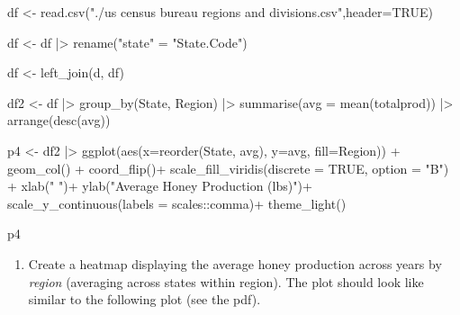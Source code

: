 \documentclass[
]{article}
\newenvironment{Shaded}{\begin{snugshade}}{\end{snugshade}}
\newcommand{\AttributeTok}[1]{\textcolor[rgb]{0.77,0.63,0.00}{#1}}
\newcommand{\ConstantTok}[1]{\textcolor[rgb]{0.00,0.00,0.00}{#1}}
\newcommand{\FunctionTok}[1]{\textcolor[rgb]{0.00,0.00,0.00}{#1}}
\newcommand{\NormalTok}[1]{#1}
\newcommand{\OtherTok}[1]{\textcolor[rgb]{0.56,0.35,0.01}{#1}}
\newcommand{\SpecialCharTok}[1]{\textcolor[rgb]{0.00,0.00,0.00}{#1}}
\newcommand{\StringTok}[1]{\textcolor[rgb]{0.31,0.60,0.02}{#1}}
\providecommand{\tightlist}{%
  \setlength{\itemsep}{0pt}\setlength{\parskip}{0pt}}
\begin{document}
\begin{Shaded}
\begin{Highlighting}[]
\NormalTok{df }\OtherTok{\textless{}{-}} \FunctionTok{read.csv}\NormalTok{(}\StringTok{"./us census bureau regions and divisions.csv"}\NormalTok{,}\AttributeTok{header=}\ConstantTok{TRUE}\NormalTok{)}

\NormalTok{df }\OtherTok{\textless{}{-}}\NormalTok{ df }\SpecialCharTok{|\textgreater{}}  \FunctionTok{rename}\NormalTok{(}\StringTok{"state"} \OtherTok{=} \StringTok{"State.Code"}\NormalTok{)}

\NormalTok{df }\OtherTok{\textless{}{-}} \FunctionTok{left\_join}\NormalTok{(d, df)}


\NormalTok{df2 }\OtherTok{\textless{}{-}}\NormalTok{ df }\SpecialCharTok{|\textgreater{}} 
    \FunctionTok{group\_by}\NormalTok{(State, Region) }\SpecialCharTok{|\textgreater{}} 
    \FunctionTok{summarise}\NormalTok{(}\AttributeTok{avg =} \FunctionTok{mean}\NormalTok{(totalprod)) }\SpecialCharTok{|\textgreater{}} 
  \FunctionTok{arrange}\NormalTok{(}\FunctionTok{desc}\NormalTok{(avg))}

\NormalTok{p4 }\OtherTok{\textless{}{-}}\NormalTok{ df2 }\SpecialCharTok{|\textgreater{}} 
  \FunctionTok{ggplot}\NormalTok{(}\FunctionTok{aes}\NormalTok{(}\AttributeTok{x=}\FunctionTok{reorder}\NormalTok{(State, avg), }\AttributeTok{y=}\NormalTok{avg, }\AttributeTok{fill=}\NormalTok{Region)) }\SpecialCharTok{+}
  \FunctionTok{geom\_col}\NormalTok{() }\SpecialCharTok{+}
  \FunctionTok{coord\_flip}\NormalTok{()}\SpecialCharTok{+}
  \FunctionTok{scale\_fill\_viridis}\NormalTok{(}\AttributeTok{discrete =} \ConstantTok{TRUE}\NormalTok{, }\AttributeTok{option =} \StringTok{"B"}\NormalTok{) }\SpecialCharTok{+}
  \FunctionTok{xlab}\NormalTok{(}\StringTok{" "}\NormalTok{)}\SpecialCharTok{+}
  \FunctionTok{ylab}\NormalTok{(}\StringTok{"Average Honey Production (lbs)"}\NormalTok{)}\SpecialCharTok{+}
  \FunctionTok{scale\_y\_continuous}\NormalTok{(}\AttributeTok{labels =}\NormalTok{ scales}\SpecialCharTok{::}\NormalTok{comma)}\SpecialCharTok{+}
  \FunctionTok{theme\_light}\NormalTok{()}


\NormalTok{p4}
\end{Highlighting}
\end{Shaded}

\begin{enumerate}
\def\labelenumi{\arabic{enumi}.}
\setcounter{enumi}{4}
\tightlist
\item
  Create a heatmap displaying the average honey production across years
  by \emph{region} (averaging across states within region). The plot
  should look like similar to the following plot (see the pdf).
\end{enumerate}
\end{document}
